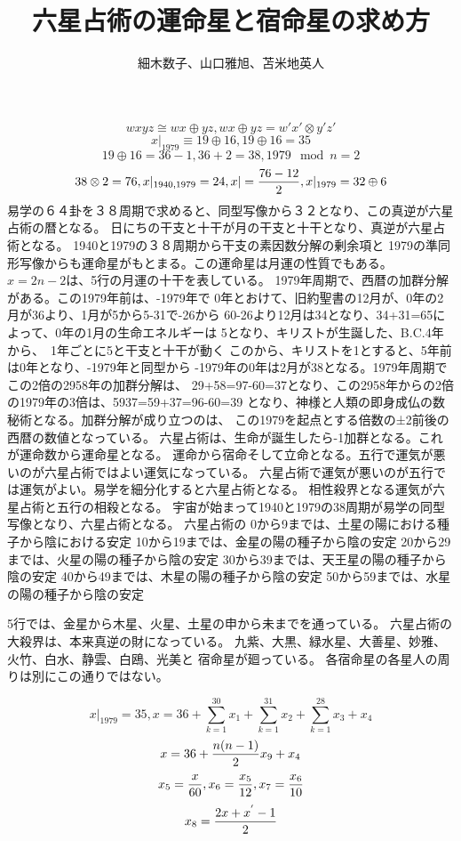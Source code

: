 \documentclass{jsarticle}
\begin{document}
{\newpage
\title{六星占術の運命星と宿命星の求め方}
\author{細木数子、山口雅旭、苫米地英人}



  $$ wxyz \cong wx \oplus yz, wx \oplus yz = w'x' \otimes y'z' $$
  $$ x|_{1979} \equiv 19 \oplus 16, 19 \oplus 16 = 35 $$ 
  $$ 19 \oplus 16 = 36 - 1, 36 + 2 = 38, 1979 \mod n = 2 $$
  $$ 38 \otimes 2 = 76, x|_{1940,1979} = 24, x| = {76 - 12 \over 2}, x|_{1979} = 32 \oplus 6 $$
  易学の６４卦を３８周期で求めると、同型写像から３２となり、この真逆が六星占術の暦となる。
  日にちの干支と十干が月の干支と十干となり、真逆が六星占術となる。
  1940と1979の３８周期から干支の素因数分解の剰余項と
  1979の準同形写像からも運命星がもとまる。この運命星は月運の性質でもある。
  $ x = 2n - 2 $は、5行の月運の十干を表している。
  1979年周期で、西暦の加群分解がある。この1979年前は、-1979年で
  0年とおけて、旧約聖書の12月が、0年の2月が36より、1月が5から5-31で-26から
  60-26より12月は34となり、34+31=65によって、0年の1月の生命エネルギーは
  5となり、キリストが生誕した、B.C.4年から、　1年ごとに5と干支と十干が動く
  このから、キリストを1とすると、5年前は0年となり、-1979年と同型から
  -1979年の0年は2月が38となる。1979年周期でこの2倍の2958年の加群分解は、
  29+58=97-60=37となり、この2958年からの2倍の1979年の3倍は、5937=59+37=96-60=39
  となり、神様と人類の即身成仏の数秘術となる。加群分解が成り立つのは、
  この1979を起点とする倍数の±2前後の西暦の数値となっている。
  六星占術は、生命が誕生したら-1加群となる。これが運命数から運命星となる。
  運命から宿命そして立命となる。五行で運気が悪いのが六星占術ではよい運気になっている。
  六星占術で運気が悪いのが五行では運気がよい。易学を細分化すると六星占術となる。
  相性殺界となる運気が六星占術と五行の相殺となる。
  宇宙が始まって1940と1979の38周期が易学の同型写像となり、六星占術となる。
  六星占術の
  0から9までは、土星の陽における種子から陰における安定
  10から19までは、金星の陽の種子から陰の安定
  20から29までは、火星の陽の種子から陰の安定
  30から39までは、天王星の陽の種子から陰の安定
  40から49までは、木星の陽の種子から陰の安定
  50から59までは、水星の陽の種子から陰の安定


  5行では、金星から木星、火星、土星の申から未までを通っている。
  六星占術の大殺界は、本来真逆の財になっている。
  九紫、大黒、緑水星、大善星、妙雅、火竹、白水、静雲、白鴎、光美と
  宿命星が廻っている。
  各宿命星の各星人の周りは別にこの通りではない。　

  $$ x|_{1979} = 35, x = 36 + \sum_{k=1}^{30} x_1 + \sum_{k=1}^{31} x_2 + \sum_{k=1}^{28} x_3 + x_4 $$
  $$ x = 36 + {n (n - 1) \over 2} x_9 + x_4 $$
  $$ x_5 = {x \over 60}, x_6 = {x_5 \over 12}, x_7 = {x_6 \over 10} $$
  $$ x_8 = {2x + x^{'} -1 \over 2} $$

}
\end{document}
